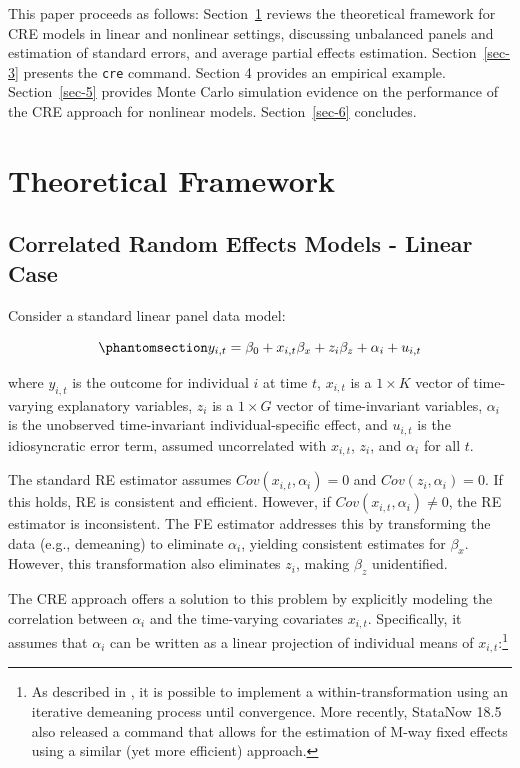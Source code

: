 \documentclass[bib]{statapress}
\begin{document}
This paper proceeds as follows: Section~\ref{sec-2} reviews the
theoretical framework for CRE models in linear and nonlinear settings,
discussing unbalanced panels and estimation of standard errors, and
average partial effects estimation. Section~\ref{sec-3} presents the
\texttt{cre} command. Section 4 provides an empirical example.
Section~\ref{sec-5} provides Monte Carlo simulation evidence on the
performance of the CRE approach for nonlinear models.
Section~\ref{sec-6} concludes.

\section{Theoretical Framework}\label{sec-2}

\subsection{Correlated Random Effects Models - Linear
Case}\label{sec-2-1}

Consider a standard linear panel data model:

\begin{equation}\phantomsection\label{eq-cre-1}{y_{i,t} = \beta_0 + x_{i,t}\beta_x + z_{i}\beta_z  + \alpha_i + u_{i,t}
}\end{equation}

where \(y_{i,t}\) is the outcome for individual \(i\) at time \(t\),
\(x_{i,t}\) is a \(1 \times K\) vector of time-varying explanatory
variables, \(z_i\) is a \(1 \times G\) vector of time-invariant
variables, \(\alpha_i\) is the unobserved time-invariant
individual-specific effect, and \(u_{i,t}\) is the idiosyncratic error
term, assumed uncorrelated with \(x_{i,t}\), \(z_i\), and \(\alpha_i\)
for all \(t\).

The standard RE estimator assumes \(Cov(x_{i,t}, \alpha_i) = 0\) and
\(Cov(z_{i}, \alpha_i) = 0\). If this holds, RE is consistent and
efficient. However, if \(Cov(x_{i,t}, \alpha_i) \neq 0\), the RE
estimator is inconsistent. The FE estimator addresses this by
transforming the data (e.g., demeaning) to eliminate \(\alpha_i\),
yielding consistent estimates for \(\beta_x\). However, this
transformation also eliminates \(z_i\), making \(\beta_z\) unidentified.

The \citet{mundlak1978pooling} CRE approach offers a solution to this
problem by explicitly modeling the correlation between \(\alpha_i\) and
the time-varying covariates \(x_{i,t}\). Specifically, it assumes that
\(\alpha_i\) can be written as a linear projection of individual means
of \(x_{i,t}\):\footnote{As described in \citet{rios2015}, it is
  possible to implement a within-transformation using an iterative
  demeaning process until convergence. More recently, StataNow 18.5 also
  released a command that allows for the estimation of M-way fixed
  effects using a similar (yet more efficient) approach.}
\end{document}

